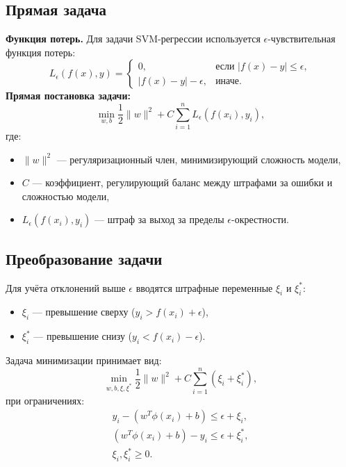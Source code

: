\subsection{Прямая задача}
\par\textbf{Функция потерь.}  
Для задачи SVM-регрессии используется \(\epsilon\)-чувствительная функция потерь:
\begin{equation*}
    L_\epsilon(f(x), y) = 
    \begin{cases} 
        0, & \text{если } |f(x) - y| \leq \epsilon, \\ 
        |f(x) - y| - \epsilon, & \text{иначе.}
    \end{cases}
\end{equation*}
\noindent\textbf{Прямая постановка задачи:}
\begin{equation*}
    \min_{w, b} \frac{1}{2} \|w\|^2 + C \sum_{i=1}^n L_\epsilon(f(x_i), y_i),
\end{equation*}
где:
\begin{itemize}
    \item \(\|w\|^2\) — регуляризационный член, минимизирующий сложность модели,
    \item \(C\) — коэффициент, регулирующий баланс между штрафами за ошибки и сложностью модели,
    \item \(L_\epsilon(f(x_i), y_i)\) — штраф за выход за пределы \(\epsilon\)-окрестности.
\end{itemize}

\subsection{Преобразование задачи}
\par Для учёта отклонений выше \(\epsilon\) вводятся штрафные переменные \(\xi_i\) и \(\xi_i^*\):  
\begin{itemize}
    \item \(\xi_i\) — превышение сверху (\(y_i > f(x_i) + \epsilon\)),
    \item \(\xi_i^*\) — превышение снизу (\(y_i < f(x_i) - \epsilon\)).
\end{itemize}
\par Задача минимизации принимает вид:
\begin{equation*}
    \min_{w, b, \xi, \xi^*} \frac{1}{2} \|w\|^2 + C \sum_{i=1}^n (\xi_i + \xi_i^*),
\end{equation*}
при ограничениях:
\begin{equation*}
\begin{aligned}
    y_i - (w^T \phi(x_i) + b) \leq \epsilon + \xi_i, \\
    (w^T \phi(x_i) + b) - y_i \leq \epsilon + \xi_i^*, \\
    \xi_i, \xi_i^* \geq 0.
\end{aligned}
\end{equation*}

